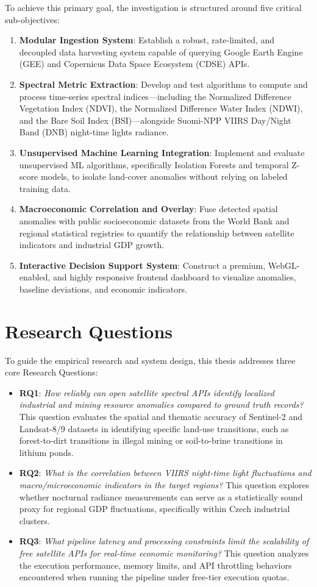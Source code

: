 To achieve this primary goal, the investigation is structured around five critical sub-objectives:
\begin{enumerate}
  \item \textbf{Modular Ingestion System}: Establish a robust, rate-limited, and decoupled data harvesting system capable of querying Google Earth Engine (GEE) and Copernicus Data Space Ecosystem (CDSE) APIs.
  \item \textbf{Spectral Metric Extraction}: Develop and test algorithms to compute and process time-series spectral indices—including the Normalized Difference Vegetation Index (NDVI), the Normalized Difference Water Index (NDWI), and the Bare Soil Index (BSI)—alongside Suomi-NPP VIIRS Day/Night Band (DNB) night-time lights radiance.
  \item \textbf{Unsupervised Machine Learning Integration}: Implement and evaluate unsupervised ML algorithms, specifically Isolation Forests and temporal Z-score models, to isolate land-cover anomalies without relying on labeled training data.
  \item \textbf{Macroeconomic Correlation and Overlay}: Fuse detected spatial anomalies with public socioeconomic datasets from the World Bank and regional statistical registries to quantify the relationship between satellite indicators and industrial GDP growth.
  \item \textbf{Interactive Decision Support System}: Construct a premium, WebGL-enabled, and highly responsive frontend dashboard to visualize anomalies, baseline deviations, and economic indicators.

\end{enumerate}
\section{Research Questions}
To guide the empirical research and system design, this thesis addresses three core Research Questions:
\begin{itemize}
  \item \textbf{RQ1}: \textit{How reliably can open satellite spectral APIs identify localized industrial and mining resource anomalies compared to ground truth records?}
    This question evaluates the spatial and thematic accuracy of Sentinel-2 and Landsat-8/9 datasets in identifying specific land-use transitions, such as forest-to-dirt transitions in illegal mining or soil-to-brine transitions in lithium ponds.
  \item \textbf{RQ2}: \textit{What is the correlation between VIIRS night-time light fluctuations and macro/microeconomic indicators in the target regions?}
    This question explores whether nocturnal radiance measurements can serve as a statistically sound proxy for regional GDP fluctuations, specifically within Czech industrial clusters.
  \item \textbf{RQ3}: \textit{What pipeline latency and processing constraints limit the scalability of free satellite APIs for real-time economic monitoring?}
    This question analyzes the execution performance, memory limits, and API throttling behaviors encountered when running the pipeline under free-tier execution quotas.

\end{itemize}

